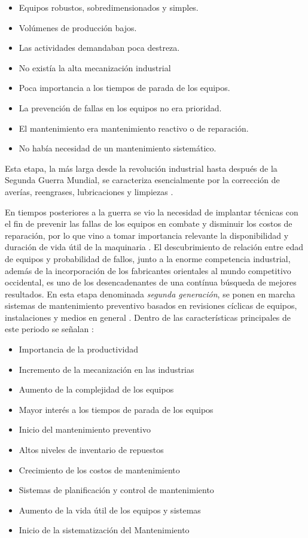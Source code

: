 \begin{itemize}
\item Equipos robustos, sobredimensionados y simples.
\item Volúmenes de producción bajos.
\item Las actividades demandaban poca destreza.
\item No existía la alta mecanización industrial
\item Poca importancia a los tiempos de parada de los equipos.
\item La prevención de fallas en los equipos no era prioridad.
\item El mantenimiento era mantenimiento reactivo o de reparación.
\item No había necesidad de un mantenimiento sistemático.
\end{itemize}  

Esta etapa, la más larga desde la revolución industrial hasta después de la Segunda Guerra Mundial, se caracteriza esencialmente por la corrección de averías, reengrases, lubricaciones y limpiezas \citep{gonzalez2005}.

En tiempos posteriores a la guerra se vio la necesidad de implantar técnicas con el fin de prevenir las fallas de los equipos en combate y disminuir los costos de reparación, por lo que vino a tomar importancia relevante la disponibilidad y duración de vida útil de la maquinaria \citep{garcia2012}. El descubrimiento de relación entre edad de equipos y probabilidad de fallos, junto a la enorme competencia industrial, además de la incorporación de los fabricantes orientales al mundo competitivo occidental, es uno de los desencadenantes de una contínua búsqueda de mejores resultados. En esta etapa denominada \textit{segunda generación}, se ponen en marcha sistemas de mantenimiento preventivo basados en revisiones cíclicas de equipos, instalaciones y medios en general \citep{gonzalez2005}. Dentro de las características principales de este periodo se señalan \citep{garcia2012}:

\begin{itemize}
\item Importancia de la productividad
\item Incremento de la mecanización en las industrias
\item Aumento de la complejidad de los equipos
\item Mayor interés a los tiempos de parada de los equipos
\item Inicio del mantenimiento preventivo
\item Altos niveles de inventario de repuestos
\item Crecimiento de los costos de mantenimiento
\item Sistemas de planificación y control de mantenimiento
\item Aumento de la vida útil de los equipos y sistemas
\item Inicio de la sistematización del Mantenimiento
\end{itemize}

